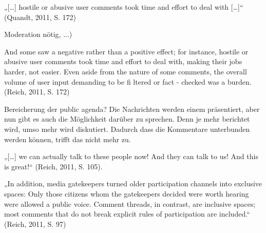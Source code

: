 \documentclass[12pt,parskip=full,ngerman]{scrreprt} %
\begin{document}
„[\ldots] hostile or abusive user comments took time and effort to deal with
[\ldots]“ (Quandt, 2011, S. 172)




Moderation nötig, ...)


And some saw a negative rather than a positive effect; for instance, hostile or
abusive user comments took time and effort to deal with, making their jobs
harder, not easier. Even aside from the nature of some comments, the overall
volume of user input demanding to be fi ltered or fact - checked was a burden.
(Reich, 2011, S. 172)




Bereicherung der public agenda? Die Nachrichten werden einem präsentiert, aber
nun gibt es auch die Möglichkeit darüber zu sprechen. Denn je mehr berichtet
wird, umso mehr wird diskutiert. Dadurch dass die Kommentare unterbunden werden
können, trifft das nicht mehr zu.

 

„[\ldots] we can actually talk to these people now! And they can talk to us! And
this is great!“ (Reich, 2011, S. 105).

„In addition, media gatekeepers  turned older participation channels into
exclusive spaces: Only those citizens whom the gatekeepers decided were
worth hearing were allowed a public voice. Comment threads, in contrast,
are inclusive spaces; most comments that do not break explicit rules of
participation are included.“ (Reich, 2011, S. 97)

%
%

\printbibliography
\end{document}
